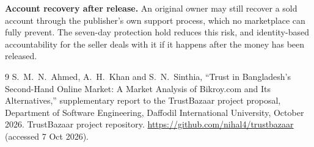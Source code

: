 \documentclass[11pt,a4paper]{article}
\begin{document}
\textbf{Account recovery after release.} An original owner may still recover a sold account through the
publisher's own support process, which no marketplace can fully prevent. The seven-day protection hold
reduces this risk, and identity-based accountability for the seller deals with it if it happens after the
money has been released.

\begin{thebibliography}{9}
\small
{} S.~M.~N.~Ahmed, A.~H.~Khan and S.~N.~Sinthia, ``Trust in Bangladesh's Second-Hand
Online Market: A Market Analysis of Bikroy.com and Its Alternatives,'' supplementary report to the
TrustBazaar project proposal, Department of Software Engineering, Daffodil International University,
October 2026.
 TrustBazaar project repository. \url{https://github.com/nihal4/trustbazaar}
(accessed 7 Oct 2026).
\end{thebibliography}
\end{document}
